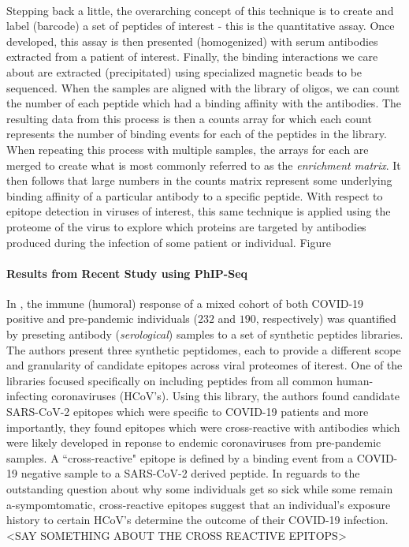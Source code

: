 \documentclass{article}
\begin{document}
~

Stepping back a little, the overarching concept of this technique is to create and label (barcode) a set of peptides of interest - this is the quantitative assay.
Once developed, this assay is then presented (homogenized) with serum antibodies extracted from a patient of interest.
Finally, the binding interactions we care about are extracted (precipitated) using specialized magnetic beads to be sequenced.
When the samples are aligned with the library of oligos, we can count the number of each peptide which had a binding affinity with the antibodies.
The resulting data from this process is then a counts array for which each count represents the number of binding events for each of the peptides in the library.
When repeating this process with multiple samples, the arrays for each are merged to create what is most commonly referred to as the \textit{enrichment matrix}.
It then follows that large numbers in the counts matrix represent some underlying binding affinity of a particular antibody to a specific peptide.
With respect to epitope detection in viruses of interest, this same technique is applied using the proteome of the virus to explore which proteins are targeted by antibodies produced during the infection of some patient or individual.
Figure 


\paragraph{Results from Recent Study using PhIP-Seq}
In \citet{Shrock2020}, the immune (humoral) response of a mixed cohort of both COVID-19 positive and pre-pandemic individuals ($232$ and $190$, respectively) was quantified by preseting antibody (\textit{serological}) samples to a set of synthetic peptides libraries.
The authors present three synthetic peptidomes, each to provide a different scope and granularity of candidate epitopes across viral proteomes of iterest.
One of the libraries focused specifically on including peptides from all common human-infecting coronaviruses (HCoV's).
Using this library, the authors found candidate SARS-CoV-2 epitopes which were specific to COVID-19 patients and more importantly, they found epitopes which were cross-reactive with antibodies which were likely developed in reponse to endemic coronaviruses from pre-pandemic samples.
A ``cross-reactive" epitope is defined by a binding event from a COVID-19 negative sample to a SARS-CoV-2 derived peptide.
In reguards to the outstanding question about why some individuals get so sick while some remain a-sympomtomatic, cross-reactive epitopes suggest that an individual's exposure history to certain HCoV's determine the outcome of their COVID-19 infection.
<SAY SOMETHING ABOUT THE CROSS REACTIVE EPITOPS>
\end{document}
